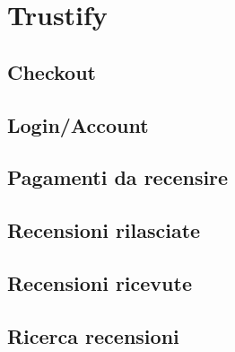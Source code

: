 \section{Trustify}

\subsection{Checkout}

\subsection{Login/Account}

\subsection{Pagamenti da recensire}

\subsection{Recensioni rilasciate}

\subsection{Recensioni ricevute}

\subsection{Ricerca recensioni}